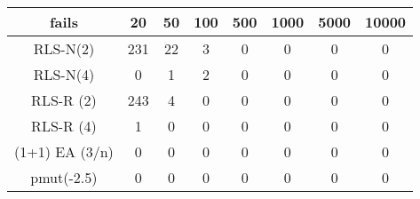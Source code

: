\begin{tabular}[h]{cccccccc}
fails&20&50&100&500&1000&5000&10000\\\hline
RLS-N(2)&231&22&3&0&0&0&0\\
RLS-N(4)&0&1&2&0&0&0&0\\
RLS-R (2)&243&4&0&0&0&0&0\\
RLS-R (4)&1&0&0&0&0&0&0\\
(1+1) EA (3/n)&0&0&0&0&0&0&0\\
pmut(-2.5)&0&0&0&0&0&0&0\\
\end{tabular}
